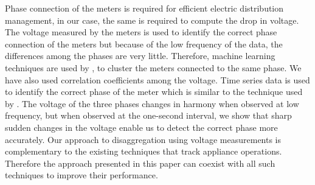 Phase connection of the meters is required for efficient electric distribution management, in our case, the same is required to compute the drop in voltage. The voltage measured by the meters is used to identify the correct phase connection of the meters but because of the low frequency of the data, the differences among the phases are very little. Therefore, machine learning techniques are used by \cite{wangPhaseIdentificationElectric2016}, \cite{mitraVoltageCorrelationsSmart2015} to cluster the meters connected to the same phase. We have also used correlation coefficients among the voltage. Time series data is used to identify the correct phase of the meter which is similar to the technique used by \cite{shortAdvancedMeteringPhase2013}. The voltage of the three phases changes in harmony when observed at low frequency, but when observed at the one-second interval, we show that sharp sudden changes in the voltage enable us to detect the correct phase more accurately.
Our approach to disaggregation using voltage measurements is complementary to the existing techniques that track appliance operations. Therefore the approach presented in this paper can coexist with all such techniques to improve their performance.
